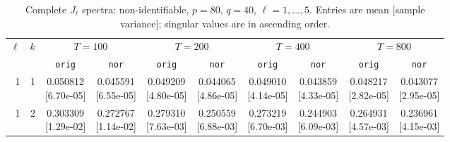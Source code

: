 \documentclass[12pt,letterpaper]{article}
\def\spacingset#1{\renewcommand{\baselinestretch}{#1}\small\normalsize}
\theoremstyle{plain}
\theoremstyle{definition}
\begin{document}
\clearpage
\begin{table}[p]
\begingroup
\spacingset{1.0}
\small\centering
\caption{Complete $J_\ell$ spectra: non-identifiable, $p=80$, $q=40$, $\ell=1,\ldots,5$. Entries are mean [sample variance]; singular values are in ascending order.}
\label{s23:lambda:alltab:spectra:p80q40exterior:1-5}
\footnotesize
\setlength{\tabcolsep}{2.2pt}
\renewcommand{\arraystretch}{1.03}
\begin{adjustbox}{max width=\linewidth}
\begin{tabular}{@{}rr*{8}{c}@{}}
\toprule
$\ell$ & $k$ & \multicolumn{2}{c}{$T=100$} & \multicolumn{2}{c}{$T=200$} & \multicolumn{2}{c}{$T=400$} & \multicolumn{2}{c}{$T=800$}\\
\cmidrule(lr){3-4}\cmidrule(lr){5-6}\cmidrule(lr){7-8}\cmidrule(lr){9-10}
 &  & \texttt{orig} & \texttt{nor} & \texttt{orig} & \texttt{nor} & \texttt{orig} & \texttt{nor} & \texttt{orig} & \texttt{nor}\\
\midrule
1 & 1 & \shortstack{0.050812\\[-1pt]{\scriptsize[6.70e-05]}} & \shortstack{0.045591\\[-1pt]{\scriptsize[6.55e-05]}} & \shortstack{0.049209\\[-1pt]{\scriptsize[4.80e-05]}} & \shortstack{0.044065\\[-1pt]{\scriptsize[4.86e-05]}} & \shortstack{0.049010\\[-1pt]{\scriptsize[4.14e-05]}} & \shortstack{0.043859\\[-1pt]{\scriptsize[4.33e-05]}} & \shortstack{0.048217\\[-1pt]{\scriptsize[2.82e-05]}} & \shortstack{0.043077\\[-1pt]{\scriptsize[2.95e-05]}}\\
1 & 2 & \shortstack{0.303309\\[-1pt]{\scriptsize[1.29e-02]}} & \shortstack{0.272767\\[-1pt]{\scriptsize[1.14e-02]}} & \shortstack{0.279310\\[-1pt]{\scriptsize[7.63e-03]}} & \shortstack{0.250559\\[-1pt]{\scriptsize[6.88e-03]}} & \shortstack{0.273219\\[-1pt]{\scriptsize[6.70e-03]}} & \shortstack{0.244903\\[-1pt]{\scriptsize[6.09e-03]}} & \shortstack{0.264931\\[-1pt]{\scriptsize[4.57e-03]}} & \shortstack{0.236961\\[-1pt]{\scriptsize[4.15e-03]}}\\

\end{tabular}
\end{adjustbox}
\end{table}
\end{document}
